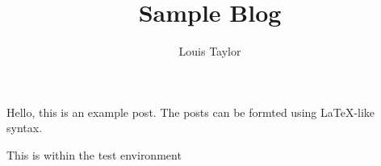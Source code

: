 \title{Sample Blog}
\author{Louis Taylor}
\maketitle

    Hello, this is an example post. The posts can be formted using LaTeX-like
    syntax.

    \begin{test}
        This is within the test environment
    \end{test}
